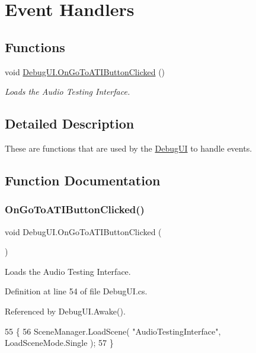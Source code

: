 \hypertarget{group___deb_u_i_handlers}{}\section{Event Handlers}
\label{group___deb_u_i_handlers}
\subsection*{Functions}
\begin{DoxyCompactItemize}
\item 
void \hyperlink{group___deb_u_i_handlers_ga16e95ec9c2c6cc4cecf06e54e316f00c}{Debug\+U\+I.\+On\+Go\+To\+A\+T\+I\+Button\+Clicked} ()
\begin{DoxyCompactList}\small\item\em Loads the Audio Testing Interface. \end{DoxyCompactList}\end{DoxyCompactItemize}


\subsection{Detailed Description}
These are functions that are used by the \hyperlink{class_debug_u_i}{Debug\+UI} to handle events. 

\subsection{Function Documentation}
\mbox{\label{group___deb_u_i_handlers_ga16e95ec9c2c6cc4cecf06e54e316f00c}} 
\subsubsection{\texorpdfstring{On\+Go\+To\+A\+T\+I\+Button\+Clicked()}{OnGoToATIButtonClicked()}}
{\footnotesize\ttfamily void Debug\+U\+I.\+On\+Go\+To\+A\+T\+I\+Button\+Clicked (\begin{DoxyParamCaption}{ }\end{DoxyParamCaption})\hspace{0.3cm}{\ttfamily [private]}}



Loads the Audio Testing Interface. 



Definition at line 54 of file Debug\+U\+I.\+cs.



Referenced by Debug\+U\+I.\+Awake().


\begin{DoxyCode}
55     \{
56         SceneManager.LoadScene( \textcolor{stringliteral}{"AudioTestingInterface"}, LoadSceneMode.Single );
57     \}
\end{DoxyCode}

